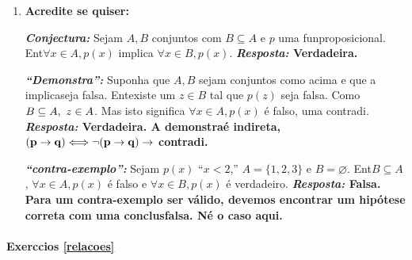 \begin{enumerate}[{\bf 1.}]
\begin{enumerate}[a)]
\item $[\exists x\in D\ni p(x)\ee \exists x\in D\ni q(x)];[\exists x\in D\ni p(x)\ee q(x)]$.

{\bf{\it Resposta:} A primeira se\'a verdade quando ${\bf P\neq\varnothing}$ e ${\bf Q\neq\varnothing}$; a segunda ser\'a verdade quando ${\bf P\inter Q\neq\varnothing}$ . Certamente a segunda condi\cao implica a primeira. Se ${\bf D=\mathbb{N}}$, ${\bf p(x)}$, ${\bf p(x)}$ \'e ``${\bf x}$ \'e par'' e ${\bf q(x)}$ \'e ``${\bf x}$ \' \ih mpar'' ent\ao a primeira \'e verdade e a segunda \'e falsa.}

\item $[\exists x\in D\ni p(x)\to q(x)];[\exists x\in D\ni p(x) \to \exists x\in D\ni q(x)]$.
\end{enumerate}

\item {\bf Acredite se quiser:}  

\noindent \textit{\textbf{Conjectura:}} Sejam $A,B$ conjuntos com $B\subseteq A$ e $p$ uma fun\cao proposicional. Ent\ao $\forall x\in A, p(x)$ implica $\forall x\in B, p(x)$. {\bf{\it Resposta:} Verdadeira.}

\noindent \textit{\textbf{``Demonstra\caoi'':}} Suponha que $A,B$ sejam conjuntos como acima e que a implica\cao seja falsa. Ent\ao existe um $z\in B$ tal que $p(z)$ seja falsa. Como $B\subseteq A, \textrm{ } z\in A$. Mas isto significa $\forall x \in A, p(x)$ \'e falso, uma contradi\caoi. {\bf{\it Resposta:} Verdadeira. A demonstra\cao \'e indireta, ${\bf (p\to q) \Longleftrightarrow \lnot(p\to q)\to}$ contradi\caoi.}

\noindent \textit{\textbf{``contra-exemplo'':}} Sejam $p(x)$ ``$x<2$,'' $A=\{1,2,3\}$ e $B=\varnothing$. Ent\ao $B\subseteq A$, $\forall x \in A, p(x)$ \'e falso e $\forall x \in B, p(x)$ \'e verdadeiro. {\bf{\it Resposta:} Falsa. Para um contra-exemplo ser v\'alido, devemos encontrar um hip\'otese correta com uma conclus\ao falsa. N\ao \'e o caso aqui.}
\end{enumerate}
\paragraph{Exerc\ih cios \ref{relacoes}}

